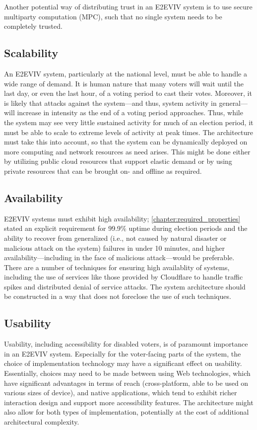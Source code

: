 Another potential way of distributing trust in an E2EVIV system is to
use secure multiparty computation (MPC), such that no single system
needs to be completely trusted. 

\subsection{Scalability}

An E2EVIV system, particularly at the national level, must be able to
handle a wide range of demand. It is human nature that many voters
will wait until the last day, or even the last hour, of a voting
period to cast their votes. Moreover, it is likely that attacks
against the system---and thus, system activity in general---will
increase in intensity as the end of a voting period approaches. Thus,
while the system may see very little sustained activity for much of an
election period, it must be able to scale to extreme levels of
activity at peak times. The architecture must take this into account,
so that the system can be dynamically deployed on more computing and
network resources as need arises. This might be done either by
utilizing public cloud resources that support elastic demand or by
using private resources that can be brought on- and offline as
required.

\subsection{Availability}

E2EVIV systems must exhibit high availability;
\autoref{chapter:required_properties} stated an explicit requirement
for 99.9\% uptime during election periods and the ability to recover
from generalized (i.e., not caused by natural disaster or malicious
attack on the system) failures in under 10 minutes, and higher
availability---including in the face of malicious attack---would be
preferable. There are a number of techniques for ensuring high
availablity of systems, including the use of services like those
provided by Cloudflare to handle traffic spikes and distributed denial
of service attacks. The system architecture should be constructed in a
way that does not foreclose the use of such techniques.

\subsection{Usability}

Usability, including accessibility for disabled voters, is of
paramount importance in an E2EVIV system. Especially for the
voter-facing parts of the system, the choice of implementation
technology may have a significant effect on usability. Essentially,
choices may need to be made between using Web technologies, which have
significant advantages in terms of reach (cross-platform, able to be
used on various sizes of device), and native applications, which tend
to exhibit richer interaction design and support more accessibility
features. The architecture might also allow for both types of
implementation, potentially at the cost of additional architectural
complexity.

